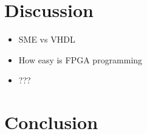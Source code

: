 \documentclass[a4paper, openany]{book}
\begin{document}
\chapter{Discussion}
\label{sec:org0abdb75}
\begin{itemize}
\item SME vs VHDL
\item How easy is FPGA programming
\item ???
\end{itemize}

\chapter{Conclusion}
\label{sec:org7b8a856}



\end{document}
